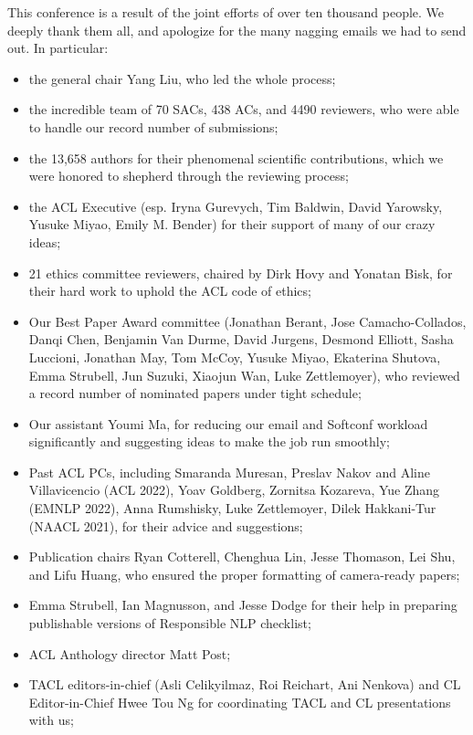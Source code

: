 This conference is a result of the joint efforts of over ten thousand people. We deeply thank them all, and apologize for the many nagging emails we had to send out. In particular:

\begin{itemize}

\item the general chair Yang Liu, who led the whole process;
\item the incredible team of 70 SACs, 438 ACs, and 4490 reviewers, who were able to handle our record number of submissions;
\item the 13,658 authors for their phenomenal scientific contributions, which we were honored to shepherd through the reviewing process;
\item the ACL Executive (esp. Iryna Gurevych, Tim Baldwin, David Yarowsky, Yusuke Miyao, Emily M. Bender) for their support of many of our crazy ideas;
\item 21 ethics committee reviewers, chaired by Dirk Hovy and Yonatan Bisk, for their hard work to uphold the ACL code of ethics;
\item Our Best Paper Award committee (Jonathan Berant, Jose Camacho-Collados, Danqi Chen, Benjamin Van Durme, David Jurgens, Desmond Elliott, Sasha Luccioni, Jonathan May, Tom McCoy, Yusuke Miyao, Ekaterina Shutova, Emma Strubell, 
Jun Suzuki, Xiaojun Wan, Luke Zettlemoyer), who reviewed a record number of nominated papers under tight schedule; 
\item Our assistant Youmi Ma, for reducing our email and Softconf workload significantly and suggesting ideas to make the job run smoothly;
\item Past \*ACL PCs, including Smaranda Muresan, Preslav Nakov and 
Aline Villavicencio (ACL 2022), Yoav Goldberg, Zornitsa Kozareva, Yue Zhang (EMNLP 2022), Anna Rumshisky, Luke Zettlemoyer, Dilek Hakkani-Tur (NAACL 2021), for their advice and suggestions;
\item Publication chairs Ryan Cotterell, Chenghua Lin, Jesse Thomason, Lei Shu, and Lifu Huang, who ensured the proper formatting of camera-ready papers;
\item Emma Strubell, Ian Magnusson, and Jesse Dodge for their help in preparing publishable versions of Responsible NLP checklist; 
\item ACL Anthology director Matt Post;
\item TACL editors-in-chief (Asli Celikyilmaz, Roi Reichart, Ani Nenkova) and CL Editor-in-Chief Hwee Tou Ng for coordinating TACL and CL presentations with us;

\end{itemize}
